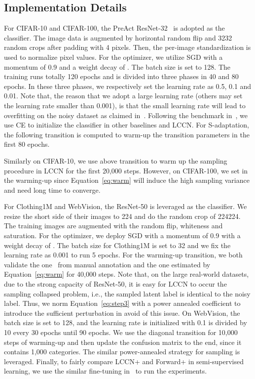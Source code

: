 \documentclass[journal]{IEEEtran}
\begin{document}
\subsection{Implementation Details}
For CIFAR-10 and CIFAR-100, the PreAct ResNet-32~\cite{he2016deep} is adopted as the classifier. The image data is augmented by horizontal random flip and 3232 random crops after padding with 4 pixels. Then, the per-image standardization is used to normalize pixel values. For the optimizer, we utilize SGD with a momentum of 0.9 and a weight decay of . The batch size is set to 128. The training runs totally 120 epochs and is divided into three phases in 40 and 80 epochs. In these three phases, we respectively set the learning rate as 0.5, 0.1 and 0.01. Note that, the reason that we adopt a large learning rate (others may set the learning rate smaller than 0.001), is that the small learning rate will lead to overfitting on the noisy dataset as claimed in~\cite{arpit2017closer}.
Following the benchmark in~\cite{patrini2017making}, we use CE to initialize the classifier in other baselines and LCCN. For S-adaptation, the following transition is computed to warm-up the transition parameters in the first 80 epochs.

Similarly on CIFAR-10, we use above transition to warm up the sampling procedure in LCCN for the first 20,000 steps. However, on CIFAR-100, we set  in the warming-up since Equation~\eqref{eq:warm} will induce the high sampling variance and need long time to converge. 

For Clothing1M and WebVision, the ResNet-50 is leveraged as the classifier. We resize the short side of their images to 224 and do the random crop of 224224. The training images are augmented with the random flip, whiteness and saturation.
For the optimizer, we deploy SGD with a momentum of 0.9 with a weight decay of . The batch size for Clothing1M is set to 32 and we fix the learning rate as 0.001 to run 5 epochs. For the warming-up transition, we both validate the one~\cite{xiao2015learning} from manual annotation and the one estimated by Equation~\eqref{eq:warm} for 40,000 steps. Note that, on the large real-world datasets, due to the strong capacity of ResNet-50, it is easy for LCCN to occur the sampling collapsed problem, i.e., the sampled latent label is identical to the noisy label. Thus, we norm Equation~\eqref{eq:step3} with a power annealed coefficient  to introduce the sufficient perturbation in avoid of this issue. On WebVision, the batch size is set to 128, and the learning rate is initialized with 0.1 is divided by 10 every 30 epochs until 90 epochs. We use the diagonal transition for 10,000 steps of warming-up and then update the confusion matrix to the end, since it contains 1,000 categories. The similar power-annealed strategy for sampling is leveraged. Finally, to fairly compare LCCN+ and Forward+ in semi-supervised learning, we use the similar fine-tuning in~\cite{patrini2017making} to run the experiments.
\end{document}
